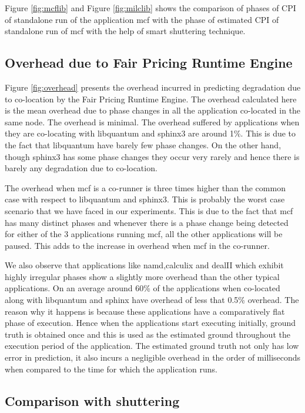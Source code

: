 \documentclass[pageno]{jpaper}
\begin{document}
Figure \ref{fig:mcflib} and Figure \ref{fig:milclib} shows the comparison of phases of CPI of standalone run of the application mcf with the phase of estimated CPI of standalone run of mcf with the help of smart shuttering technique. 
\subsection{Overhead due to Fair Pricing Runtime Engine}
\label{subsec:OverheadduetoFairPricingRuntimeEngine}

Figure \ref{fig:overhead} presents the overhead incurred in predicting degradation due to co-location by the Fair Pricing Runtime Engine. The overhead calculated here is the mean overhead due to phase changes in all the application co-located in the same node. The overhead is minimal. The overhead suffered by applications when they are co-locating with libquantum and sphinx3 are around 1\%. This is due to the fact that libquantum have barely few phase changes. On the other hand, though sphinx3 has some phase changes they occur very rarely and hence there is barely any degradation due to co-location.

The overhead when mcf is a co-runner is three times higher than the common case with respect to libquantum and sphinx3. This is probably the worst case scenario that we have faced in our experiments. This is due to the fact that mcf has many distinct phases and whenever there is a phase change being detected for either of the 3 applications running mcf, all the other applications will be paused. This adds to the increase in overhead when mcf in the co-runner.

We also observe that applications like namd,calculix and dealII which exhibit highly irregular phases show a slightly more overhead than the other typical applications. On an average around 60\% of the applications when co-located along with libquantum and sphinx have overhead of less that 0.5\% overhead. The reason why it happens is because these applications have a comparatively flat phase of execution. Hence when the applications start executing initially, ground truth is obtained once and this is used as the estimated ground throughout the execution period of the application. The estimated ground truth not only has low error in prediction, it also incurs a negligible overhead in the order of milliseconds when compared to the time for which the application runs.
\subsection{Comparison with shuttering}
\label{subsec:Comparisonwithshuttering}
\end{document}
